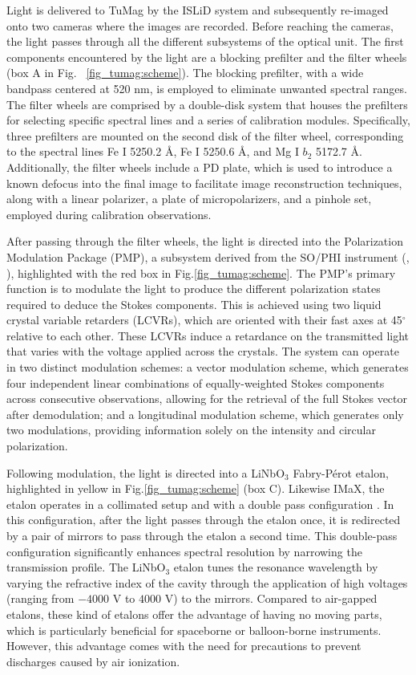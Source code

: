 Light is delivered to TuMag by the ISLiD system and subsequently re-imaged onto two cameras where the images are recorded. Before reaching the cameras, the light passes through all the different subsystems of the optical unit. The first components encountered by the light are a blocking prefilter and the filter wheels (box A in Fig. ~\ref{fig_tumag:scheme}). The blocking prefilter, with a wide bandpass centered at 520 nm, is employed to eliminate unwanted spectral ranges. The filter wheels  are comprised by a double-disk system \citep{filter-wheels} that houses the prefilters for selecting specific spectral lines and a series of calibration modules. Specifically, three prefilters are mounted on the second disk of the filter wheel, corresponding to the spectral lines Fe I 5250.2 \r{A}, Fe I 5250.6 \r{A}, and Mg I $b_2$ 5172.7 \r{A}. Additionally, the filter wheels include a PD plate, which is used to introduce a known defocus into the final image to facilitate image reconstruction techniques, along with a linear polarizer, a plate of micropolarizers, and a pinhole set, employed during calibration observations.

After passing through the filter wheels, the light is directed into the Polarization Modulation Package (PMP), a subsystem derived from the SO/PHI instrument (\citealt{pmp1}, \citealt{PHI}), highlighted with the red box in Fig.\ref{fig_tumag:scheme}. The PMP's primary function is to modulate the light to produce the different polarization states required to deduce the Stokes components. This is achieved using two liquid crystal variable retarders (LCVRs), which are oriented with their fast axes at 45$^\circ$ relative to each other. These LCVRs induce a retardance on the transmitted light that varies with the voltage applied across the crystals. The system can operate in two distinct modulation schemes: a vector modulation scheme, which generates four independent linear combinations of equally-weighted Stokes components across consecutive observations, allowing for the retrieval of the full Stokes vector after demodulation; and a longitudinal modulation scheme, which generates only two modulations, providing information solely on the intensity and circular polarization.

Following modulation, the light is directed into a LiNbO$_3$ Fabry-Pérot etalon, highlighted in yellow in Fig.\ref{fig_tumag:scheme} (box C). Likewise IMaX, the etalon operates in a collimated setup and with a double pass configuration \citep{etalon-doublepass}. In this configuration, after the light passes through the etalon once, it is redirected by a pair of mirrors to pass through the etalon a second time. This double-pass configuration significantly enhances spectral resolution by narrowing the transmission profile. The LiNbO$_3$ etalon tunes the resonance wavelength by varying the refractive index of the cavity through the application of high voltages (ranging from $-4000$ V to $4000$ V) to the mirrors. Compared to air-gapped etalons, these kind of etalons offer the advantage of having no moving parts, which is particularly beneficial for spaceborne or balloon-borne instruments. However, this advantage comes with the need for precautions to prevent discharges caused by air ionization.

